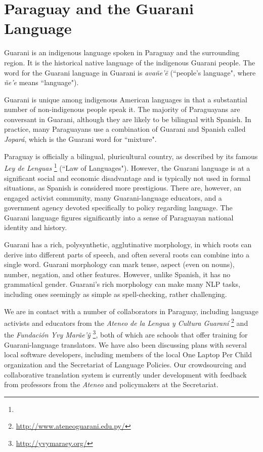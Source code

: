 \section{Paraguay and the Guarani Language}
Guarani is an indigenous language spoken in Paraguay and the surrounding
region.
It is the historical native language of the indigenous Guarani people. The
word for the Guarani language in Guarani is \emph{avañe'\~{e}} (``people's
language", where \emph{ñe'e} means ``language").

Guarani is unique among indigenous American languages in that a substantial
number of non-indigenous people speak it. The majority of Paraguayans are
conversant in Guarani, although they are likely to be bilingual with Spanish.
In practice, many Paraguayans use a combination of Guarani and Spanish called
\emph{Jopar{\'a}}, which is the Guarani word for ``mixture".

Paraguay is officially a bilingual, pluricultural country, as described by its
famous \emph{Ley de Lenguas} \footnote{\leydelenguas} (``Law of Languages").
However, the Guarani language is at a significant social and economic
disadvantage and is typically not used in formal situations, as Spanish is
considered more prestigious. There are, however, an engaged activist
community, many Guarani-language educators, and a government agency devoted
specifically to policy regarding language.
The Guarani language figures significantly into a sense of Paraguayan national
identity and history.

Guarani has a rich, polysynthetic, agglutinative morphology, in which roots can
derive into different parts of speech, and often several roots can combine into
a single word. Guarani morphology can mark tense, aspect (even on nouns),
number, negation, and other features. However, unlike Spanish, it has no
grammatical gender.  Guarani's rich morphology can make many NLP tasks,
including ones seemingly as simple as spell-checking, rather challenging.

We are in contact with a number of collaborators in Paraguay, including
language activists and educators from the \emph{Ateneo de la Lengua y Cultura
Guaraní} \footnote{\url{http://www.ateneoguarani.edu.py/}} and the
\emph{Fundación Yvy Marãe'{\~y}} \footnote{\url{http://yvymaraey.org/}},
both of which are schools that offer training for Guarani-language translators.
We have also been discussing plans with several local software
developers, including members of the local One Laptop Per Child organization
and the Secretariat of Language Policies. Our crowdsourcing and
collaborative translation system \cite{RUDNICK14.151} is currently under
development with feedback from professors from the \emph{Ateneo} and
policymakers at the Secretariat.

